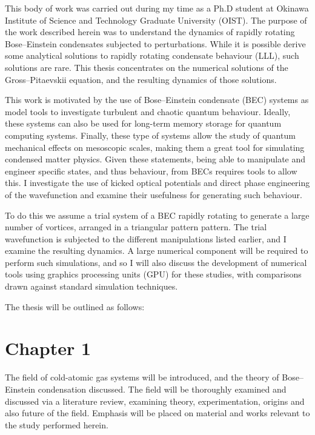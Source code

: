 
This body of work was carried out during my time as a Ph.D student at Okinawa Institute of Science and Technology Graduate University (OIST). The purpose of the work described herein was to understand the dynamics of rapidly rotating Bose--Einstein condensates subjected to perturbations. While it is possible derive some analytical solutions to rapidly rotating condensate behaviour (LLL), such solutions are rare. This thesis concentrates on the numerical solutions of the Gross--Pitaevskii equation, and the resulting dynamics of those solutions.

This work is motivated by the use of Bose--Einstein condensate (BEC) systems as model tools to investigate turbulent and chaotic quantum behaviour. Ideally, these systems can also be used for long-term memory storage for quantum computing systems. Finally, these type of systems allow the study of quantum mechanical effects on mesoscopic scales, making them a great tool for simulating condensed matter physics. Given these statements, being able to manipulate and engineer specific states, and thus behaviour, from BECs requires tools to allow this. I investigate the use of kicked optical potentials and direct phase engineering of the wavefunction and examine their usefulness for generating such behaviour.

To do this we assume a trial system of a BEC rapidly rotating to generate a large number of vortices, arranged in a triangular pattern pattern. The trial wavefunction is subjected to the different manipulations listed earlier, and I examine the resulting dynamics. A large numerical component will be required to perform such simulations, and so I will also discuss the development of numerical tools using graphics processing units (GPU) for these studies, with comparisons drawn against standard simulation techniques.

The thesis will be outlined as follows:

\section{Chapter 1}
The field of cold-atomic gas systems will be introduced, and the theory of Bose--Einstein condensation discussed. The field will be thoroughly examined and discussed via a literature review, examining theory, experimentation, origins and also future of the field. Emphasis will be placed on material and works relevant to the study performed herein.

